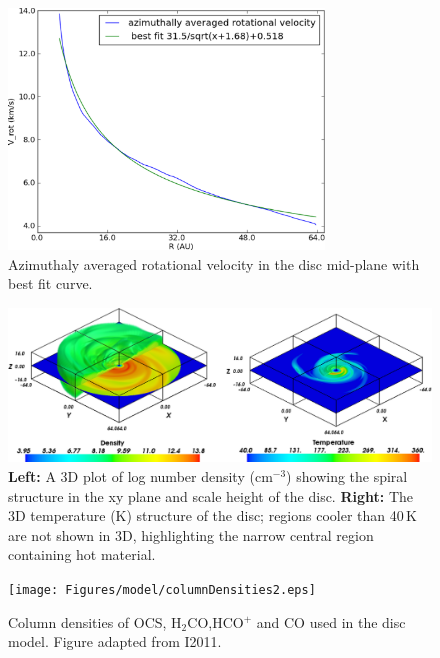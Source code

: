 \documentclass[useAMS,usenatbib]{mn2e}
\begin{document}
\begin{figure}
 \includegraphics[width=84mm]{Figures/model/rotational_velocities.eps}
 \caption{Azimuthaly averaged rotational velocity in the disc mid-plane with best fit curve.}
 \label{velocity}
\end{figure}

\begin{figure}
 \includegraphics[width=168mm]{Figures/model/rhoT6.eps}
 \caption{{\bf Left:} A 3D plot of log number density (cm$^{-3}$) showing the spiral structure in the xy plane and scale height of the disc. {\bf Right:} The 3D temperature (K) structure of the disc; regions cooler than 40$\,$K are not shown in 3D, highlighting the narrow central region containing hot material.}
 \label{rhoT} 
\end{figure}

\begin{figure}
 \texttt{[image: Figures/model/columnDensities2.eps]}
 \caption{Column densities of OCS, H$_2$CO,HCO$^+$ and CO used in the disc model. Figure adapted from I2011.}
 \label{Chemistry} 
\end{figure}
\end{document}

